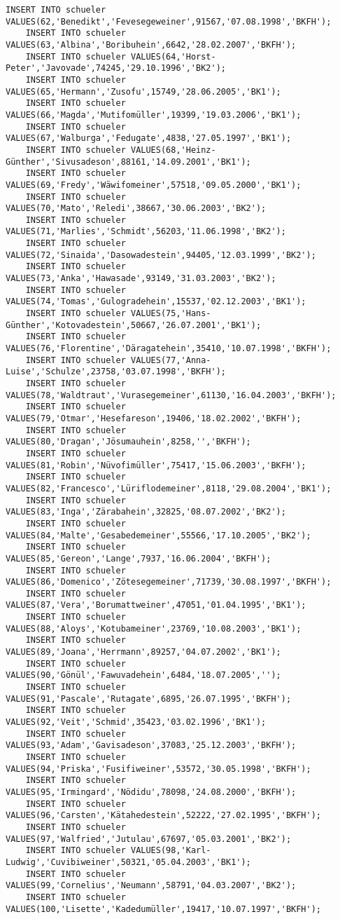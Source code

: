 \begin{lstlisting}[breaklines=True, numbers=none, basicstyle=\tiny, keepspaces=false]
	INSERT INTO schueler VALUES(62,'Benedikt','Fevesegeweiner',91567,'07.08.1998','BKFH');
	INSERT INTO schueler VALUES(63,'Albina','Boribuhein',6642,'28.02.2007','BKFH');
	INSERT INTO schueler VALUES(64,'Horst-Peter','Javovade',74245,'29.10.1996','BK2');
	INSERT INTO schueler VALUES(65,'Hermann','Zusofu',15749,'28.06.2005','BK1');
	INSERT INTO schueler VALUES(66,'Magda','Mutifomüller',19399,'19.03.2006','BK1');
	INSERT INTO schueler VALUES(67,'Walburga','Fedugate',4838,'27.05.1997','BK1');
	INSERT INTO schueler VALUES(68,'Heinz-Günther','Sivusadeson',88161,'14.09.2001','BK1');
	INSERT INTO schueler VALUES(69,'Fredy','Wäwifomeiner',57518,'09.05.2000','BK1');
	INSERT INTO schueler VALUES(70,'Mato','Reledi',38667,'30.06.2003','BK2');
	INSERT INTO schueler VALUES(71,'Marlies','Schmidt',56203,'11.06.1998','BK2');
	INSERT INTO schueler VALUES(72,'Sinaida','Dasowadestein',94405,'12.03.1999','BK2');
	INSERT INTO schueler VALUES(73,'Anka','Hawasade',93149,'31.03.2003','BK2');
	INSERT INTO schueler VALUES(74,'Tomas','Gulogradehein',15537,'02.12.2003','BK1');
	INSERT INTO schueler VALUES(75,'Hans-Günther','Kotovadestein',50667,'26.07.2001','BK1');
	INSERT INTO schueler VALUES(76,'Florentine','Däragatehein',35410,'10.07.1998','BKFH');
	INSERT INTO schueler VALUES(77,'Anna-Luise','Schulze',23758,'03.07.1998','BKFH');
	INSERT INTO schueler VALUES(78,'Waldtraut','Vurasegemeiner',61130,'16.04.2003','BKFH');
	INSERT INTO schueler VALUES(79,'Otmar','Hesefareson',19406,'18.02.2002','BKFH');
	INSERT INTO schueler VALUES(80,'Dragan','Jösumauhein',8258,'','BKFH');
	INSERT INTO schueler VALUES(81,'Robin','Nüvofimüller',75417,'15.06.2003','BKFH');
	INSERT INTO schueler VALUES(82,'Francesco','Lüriflodemeiner',8118,'29.08.2004','BK1');
	INSERT INTO schueler VALUES(83,'Inga','Zärabahein',32825,'08.07.2002','BK2');
	INSERT INTO schueler VALUES(84,'Malte','Gesabedemeiner',55566,'17.10.2005','BK2');
	INSERT INTO schueler VALUES(85,'Gereon','Lange',7937,'16.06.2004','BKFH');
	INSERT INTO schueler VALUES(86,'Domenico','Zötesegemeiner',71739,'30.08.1997','BKFH');
	INSERT INTO schueler VALUES(87,'Vera','Borumattweiner',47051,'01.04.1995','BK1');
	INSERT INTO schueler VALUES(88,'Aloys','Kotubameiner',23769,'10.08.2003','BK1');
	INSERT INTO schueler VALUES(89,'Joana','Herrmann',89257,'04.07.2002','BK1');
	INSERT INTO schueler VALUES(90,'Gönül','Fawuvadehein',6484,'18.07.2005','');
	INSERT INTO schueler VALUES(91,'Pascale','Rutagate',6895,'26.07.1995','BKFH');
	INSERT INTO schueler VALUES(92,'Veit','Schmid',35423,'03.02.1996','BK1');
	INSERT INTO schueler VALUES(93,'Adam','Gavisadeson',37083,'25.12.2003','BKFH');
	INSERT INTO schueler VALUES(94,'Priska','Fusifiweiner',53572,'30.05.1998','BKFH');
	INSERT INTO schueler VALUES(95,'Irmingard','Nödidu',78098,'24.08.2000','BKFH');
	INSERT INTO schueler VALUES(96,'Carsten','Kätahedestein',52222,'27.02.1995','BKFH');
	INSERT INTO schueler VALUES(97,'Walfried','Jutulau',67697,'05.03.2001','BK2');
	INSERT INTO schueler VALUES(98,'Karl-Ludwig','Cuvibiweiner',50321,'05.04.2003','BK1');
	INSERT INTO schueler VALUES(99,'Cornelius','Neumann',58791,'04.03.2007','BK2');
	INSERT INTO schueler VALUES(100,'Lisette','Kadedumüller',19417,'10.07.1997','BKFH');
\end{lstlisting}
